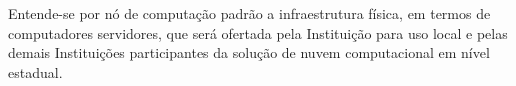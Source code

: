 \documentclass[tese,capa]{texufpel}
\begin{document}
Entende-se por nó de computação padrão a infraestrutura física, em termos de computadores servidores, que será ofertada pela Instituição para uso local e pelas demais Instituições participantes da solução de nuvem computacional em nível estadual.

\end{document}
